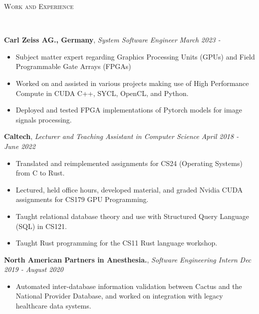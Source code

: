 \documentclass[8pt]{article}
\newenvironment{changemargin}[2]{%
  \begin{list}{}{%
    \setlength{\topsep}{0pt}%
    \setlength{\leftmargin}{#1}%
    \setlength{\rightmargin}{#2}%
    \setlength{\listparindent}{\parindent}%
    \setlength{\itemindent}{\parindent}%
    \setlength{\parsep}{\parskip}%
  }%
  \item[]}{\end{list}
}
\newcommand{\lineover}{
	\begin{changemargin}{-0.05in}{-0.05in}
		\vspace*{-8pt}
		\hrulefill \\
		\vspace*{-2pt}
	\end{changemargin}
}
\newcommand{\header}[1]{
	\begin{changemargin}{-0.5in}{-0.5in}
		\scshape{#1}\\
  	\lineover
	\end{changemargin}
}
\newenvironment{body} {
	\vspace*{-16pt}
	\begin{changemargin}{-0.25in}{-0.5in}
  }	
	{\end{changemargin}
}
\begin{document}
\header{Work and Experience}
\begin{body}
	\vspace{12pt}
	\textbf{Carl Zeiss AG., Germany}, \emph{System Software Engineer} \hfill \emph{March 2023 - }\\
	\vspace*{-4pt}
	\begin{itemize} \itemsep -0pt %
		\item Subject matter expert regarding Graphics Processing Units (GPUs) and Field Programmable Gate Arrays (FPGAs)
		\item Worked on and assisted in various projects making use of High Performance Compute in CUDA C++, SYCL, OpenCL, and Python.
		\item Deployed and tested FPGA implementations of Pytorch models for image signals processing. 
	\end{itemize}
	\vspace*{-4pt}
 
	\textbf{Caltech}, \emph{Lecturer and Teaching Assistant in Computer Science} \hfill \emph{April 2018 - June 2022}\\
	\vspace*{-4pt}
	\begin{itemize} \itemsep -0pt %
		\item Translated and reimplemented assignments for CS24 (Operating
		Systems) from C to Rust.
		\item Lectured, held office hours, developed material, and graded Nvidia CUDA assignments for CS179 GPU Programming.
		\item Taught relational database theory and use with Structured Query Language
		      (SQL) in CS121.
		\item Taught Rust programming for the CS11 Rust language workshop.
	\end{itemize}
	\vspace*{-4pt}

	\textbf{North American Partners in Anesthesia.}, \emph{Software Engineering Intern} \hfill
	\emph{Dec 2019 - August 2020}\\
	\vspace*{-3pt}
	\begin{itemize} \itemsep -0pt %
		\item Automated inter-database information validation between Cactus and the
		      National Provider Database, and worked on integration with legacy healthcare data systems.
	\end{itemize}
	\vspace*{-4pt}


\end{body}
\end{document}
